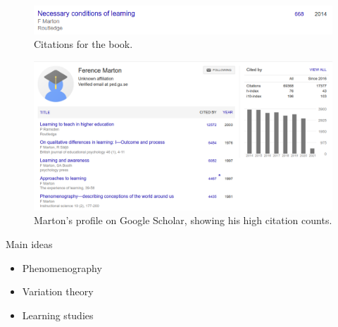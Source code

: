 \begin{frame}
  \begin{figure}
    \includegraphics[width=\columnwidth]{fig/necessary-conditions-citations.png}
    \caption{Citations for the book.}
  \end{figure}
\end{frame}

\begin{frame}
  \begin{figure}
    \includegraphics[width=\columnwidth]{fig/marton-gscholar.png}
    \caption{Marton's profile on Google Scholar, showing his high citation 
    counts.}
  \end{figure}
\end{frame}

\begin{frame}
\end{frame}

\begin{frame}
  \begin{block}{Main ideas}
    \begin{itemize}
      \item Phenomenography~\cite{Phenomenography}
      \item Variation theory~\cite{VariationTheory}
      \item Learning studies~\cite{LearningStudy}
    \end{itemize}
  \end{block}
\end{frame}

